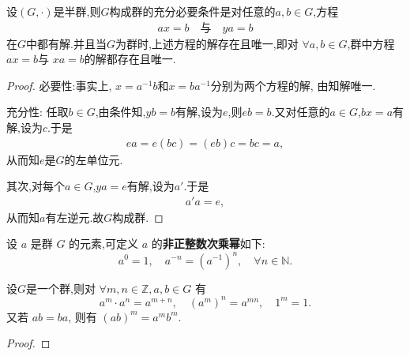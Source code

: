 \documentclass[../../main.tex]{subfiles}%
\begin{document}
\begin{theorem}\label{theorem:群的充要条件--方程有解}
设$(G,\cdot)$是半群,则$G$构成群的充分必要条件是对任意的$a,b \in G$,方程
\begin{align*}
ax = b \quad \text{与} \quad ya = b
\end{align*}
在$G$中都有解.并且当$G$为群时,上述方程的解存在且唯一,即对 \(\forall a, b \in G \),群中方程 \( ax = b \)与 \( xa = b \)的解都存在且唯一.
\end{theorem}
\begin{proof}

{\heiti 必要性:}事实上, \( x = a^{-1}b \)和\( x = ba^{-1} \)分别为两个方程的解, 由知解唯一.

{\heiti 充分性:} 任取$b \in G$,由条件知,$yb = b$有解,设为$e$,则$eb = b$.又对任意的$a \in G$,$bx = a$有解,设为$c$.于是
\begin{align*}
ea = e(bc) = (eb)c = bc = a,
\end{align*}
从而知$e$是$G$的左单位元.

其次,对每个$a \in G$,$ya = e$有解,设为$a'$.于是
\begin{align*}
a'a = e,
\end{align*}
从而知$a$有左逆元.故$G$构成群.

\end{proof}

\begin{definition}
设 \( a \) 是群 \( G \) 的元素,可定义 \( a \) 的\textbf{非正整数次乘幂}如下:
\[
a^0 = 1, \quad a^{-n} = (a^{-1})^n, \quad \forall n \in \mathbb{N}.
\]
\end{definition}

\begin{theorem}
设$G$是一个群,则对 \( \forall m, n \in \mathbb{Z}, a, b \in G \) 有
\[
a^m \cdot a^n = a^{m+n}, \quad (a^m)^n = a^{mn}, \quad 1^m = 1.
\]
又若 \( ab = ba \), 则有 \( (ab)^m = a^m b^m \).
\end{theorem}
\begin{proof}



\end{proof}
\end{document}
